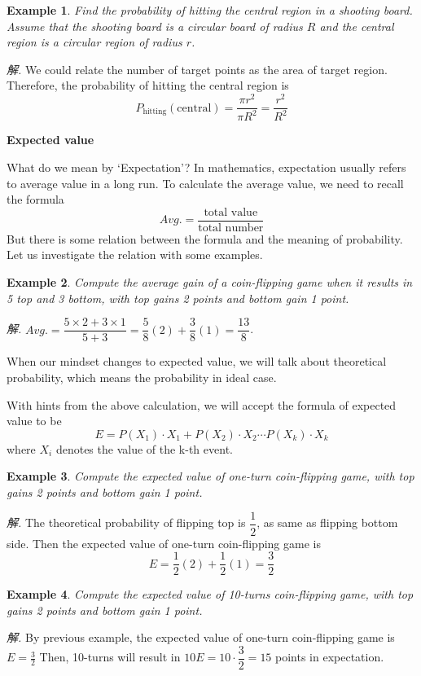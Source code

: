 \documentclass[12pt]{article}
\newtheorem{example}{Example}
\begin{document}
    \begin{example}
        Find the probability of hitting the central region in a shooting board. Assume that the shooting board is a circular board of radius $R$ and the central region is a circular region of radius $r$.
    \end{example}

    \textit{ 解.} We could relate the number of target points as the area of target region. Therefore, the probability of hitting the central region is $$P_{\textrm{hitting}}(\textrm{central})=\frac{\pi r^2}{\pi R^2}=\frac{r^2}{R^2}$$

    \begin{center}
        \textbf{Expected value}
    \end{center}

    What do we mean by `Expectation'? In mathematics, expectation usually refers to average value in a long run. To calculate the average value, we need to recall the formula $$Avg.=\frac{\textrm{total value}}{\textrm{total number}}$$ But there is some relation between the formula and the meaning of probability. Let us investigate the relation with some examples.

    \begin{example}
        Compute the average gain of a coin-flipping game when it results in 5 top and 3 bottom, with top gains 2 points and bottom gain 1 point.
    \end{example}

    \textit{ 解.} $Avg.=\dfrac{5\times 2+3\times 1}{5+3}=\dfrac{5}{8}(2)+\dfrac{3}{8}(1)=\dfrac{13}{8}$.

    When our mindset changes to expected value, we will talk about theoretical probability, which means the probability in ideal case.

    With hints from the above calculation, we will accept the formula of expected value to be $$E=P(X_1)\cdot X_1+P(X_2)\cdot X_2\cdots P(X_k)\cdot X_k$$ where $X_i$ denotes the value of the k-th event.

    \begin{example}
        Compute the expected value of one-turn coin-flipping game, with top gains 2 points and bottom gain 1 point.
    \end{example}

    \textit{ 解.} The theoretical probability of flipping top is $\dfrac{1}{2}$, as same as flipping bottom side. Then the expected value of one-turn coin-flipping game is $$E=\frac{1}{2}(2)+\frac{1}{2}(1)=\frac{3}{2}$$

    \begin{example}
        Compute the expected value of 10-turns coin-flipping game, with top gains 2 points and bottom gain 1 point.
    \end{example}

    \textit{ 解.} By previous example, the expected value of one-turn coin-flipping game is $E=\frac{3}{2}$ Then, 10-turns will result in $10E=10\cdot\dfrac{3}{2}=15$ points in expectation.
\end{document}

